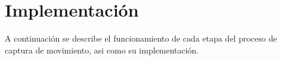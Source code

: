 \section{Implementación}\label{implementacionPosta}
A continuación se describe el funcionamiento de cada etapa del proceso de captura de movimiento, asi como su implementación.



